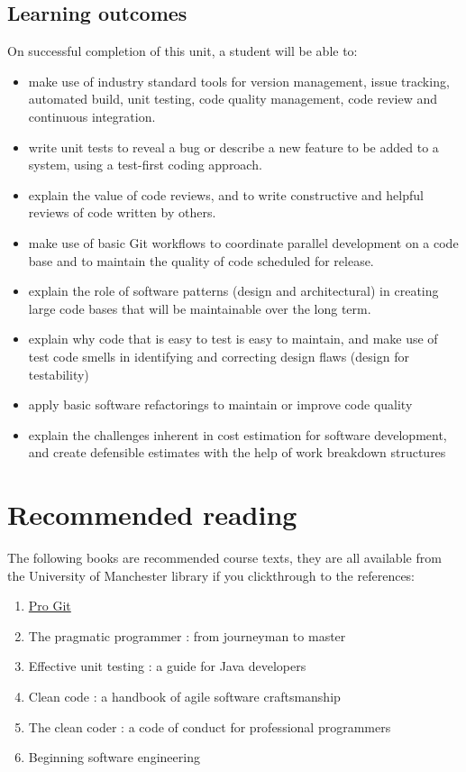 \documentclass[
]{book}
\providecommand{\tightlist}{%
  \setlength{\itemsep}{0pt}\setlength{\parskip}{0pt}}
\begin{document}
\hypertarget{learning-outcomes}{%
\subsection{Learning outcomes}\label{learning-outcomes}}

On successful completion of this unit, a student will be able to:

\begin{itemize}
\tightlist
\item
  make use of industry standard tools for version management, issue tracking, automated build, unit testing, code quality management, code review and continuous integration.
\item
  write unit tests to reveal a bug or describe a new feature to be added to a system, using a test-first coding approach.
\item
  explain the value of code reviews, and to write constructive and helpful reviews of code written by others.
\item
  make use of basic Git workflows to coordinate parallel development on a code base and to maintain the quality of code scheduled for release.
\item
  explain the role of software patterns (design and architectural) in creating large code bases that will be maintainable over the long term.
\item
  explain why code that is easy to test is easy to maintain, and make use of test code smells in identifying and correcting design flaws (design for testability)
\item
  apply basic software refactorings to maintain or improve code quality
\item
  explain the challenges inherent in cost estimation for software development, and create defensible estimates with the help of work breakdown structures
\end{itemize}

\hypertarget{recread}{%
\section{Recommended reading}\label{recread}}

The following books are recommended course texts, they are all available from the University of Manchester library if you clickthrough to the references:

\begin{enumerate}
\def\labelenumi{\arabic{enumi}.}
\tightlist
\item
  \href{https://git-scm.com/book/en/v2}{Pro Git} \citep{progit}
\item
  The pragmatic programmer : from journeyman to master \citep{pragmatic}
\item
  Effective unit testing : a guide for Java developers \citep{unittesting}
\item
  Clean code : a handbook of agile software craftsmanship \citep{cleancode}
\item
  The clean coder : a code of conduct for professional programmers \citep{cleancoder}
\item
  Beginning software engineering \citep{beginning}
\end{enumerate}
\end{document}

